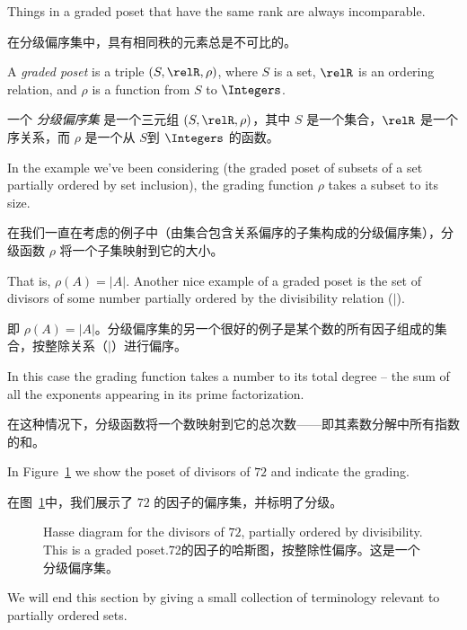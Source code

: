 Things
in a graded poset that have the same rank are always incomparable.

在分级偏序集中，具有相同秩的元素总是不可比的。

\begin{defi}
A \emph{graded poset} is a triple $(S, \relR, \rho)$, where $S$ is a set,
$\relR$ is an ordering relation, and $\rho$ is a function from $S$ to $\Integers$.
\end{defi}

\begin{defi}
一个 \emph{分级偏序集} 是一个三元组 $(S, \relR, \rho)$，其中 $S$ 是一个集合，$\relR$ 是一个序关系，而 $\rho$ 是一个从 $S$到 $\Integers$ 的函数。
\end{defi}

In the example we've been considering (the graded poset of subsets of a set
partially ordered by set inclusion), the grading function $\rho$ takes a
subset to its size.

在我们一直在考虑的例子中（由集合包含关系偏序的子集构成的分级偏序集），分级函数 $\rho$ 将一个子集映射到它的大小。

That is, $\rho(A) = |A|$.  Another nice example of
a graded poset is the set of divisors of some number partially ordered
by the divisibility relation ($\mid$).

即 $\rho(A) = |A|$。分级偏序集的另一个很好的例子是某个数的所有因子组成的集合，按整除关系（$\mid$）进行偏序。

In this case the grading function
takes a number to its total degree -- the sum of all the exponents
appearing in its prime factorization.

在这种情况下，分级函数将一个数映射到它的总次数——即其素数分解中所有指数的和。

In Figure~\ref{fig:divisors_of_72}
we show the poset of divisors of $72$ and indicate the grading.

在图~\ref{fig:divisors_of_72}中，我们展示了 $72$ 的因子的偏序集，并标明了分级。

\begin{figure}[!hbtp]

\caption[Hasse diagram of divisors of 72. 72的因子的哈斯图。]{Hasse %
diagram for the divisors of $72$, partially ordered by %
divisibility. This is a graded poset.72的因子的哈斯图，按整除性偏序。这是一个分级偏序集。}
\label{fig:divisors_of_72} 
\end{figure}

We will end this section by giving a small collection of terminology
relevant to partially ordered sets.

